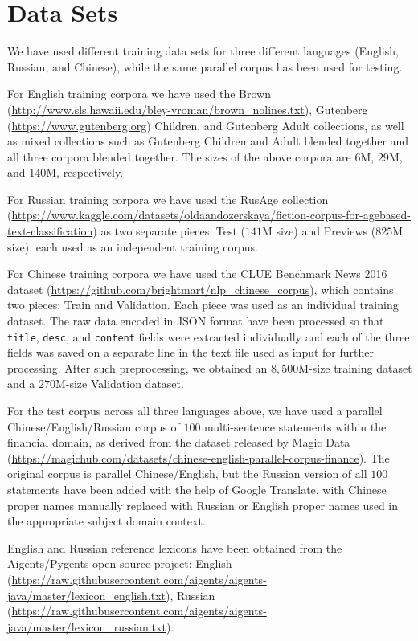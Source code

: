 \documentclass[11pt]{article}
\begin{document}
\section{\label{data}Data Sets}

We have used different training data sets for three different languages (English, Russian, and Chinese), while the same parallel corpus has been used for testing.

For English training corpora we have used the Brown (\url{http://www.sls.hawaii.edu/bley-vroman/brown_nolines.txt}), Gutenberg (\url{https://www.gutenberg.org}) Children, and Gutenberg Adult collections, as well as mixed collections such as Gutenberg Children and Adult blended together and all three corpora blended together. The sizes of the above corpora are $6$M, $29$M, and $140$M, respectively. 

For Russian training corpora we have used the RusAge collection (\url{https://www.kaggle.com/datasets/oldaandozerskaya/fiction-corpus-for-agebased-text-classification}) as two separate pieces: Test ($141$M size) and Previews ($825$M size), each used as an independent training corpus.

For Chinese training corpora we have used the CLUE Benchmark News 2016 dataset (\url{https://github.com/brightmart/nlp_chinese_corpus}), which contains two pieces: Train and Validation. Each piece was used as an individual training dataset. The raw data encoded in JSON format have been processed so that \texttt{title}, \texttt{desc}, and \texttt{content} fields were extracted individually and each of the three fields was saved on a separate line in the text file used as input for further processing. After such preprocessing, we obtained an $8,500$M-size training dataset and a $270$M-size Validation dataset. 

For the test corpus across all three languages above, we have used a parallel Chinese/English/Russian corpus of $100$ multi-sentence statements within the financial domain, as derived from the dataset released by Magic Data (\url{https://magichub.com/datasets/chinese-english-parallel-corpus-finance}). The original corpus is parallel Chinese/English, but the Russian version of all $100$ statements have been added with the help of Google Translate, with Chinese proper names manually replaced with Russian or English proper names used in the appropriate subject domain context.

English and Russian reference lexicons have been obtained from the Aigents/Pygents open source project: English (\url{https://raw.githubusercontent.com/aigents/aigents-java/master/lexicon_english.txt}), Russian (\url{https://raw.githubusercontent.com/aigents/aigents-java/master/lexicon_russian.txt}).
\end{document}
